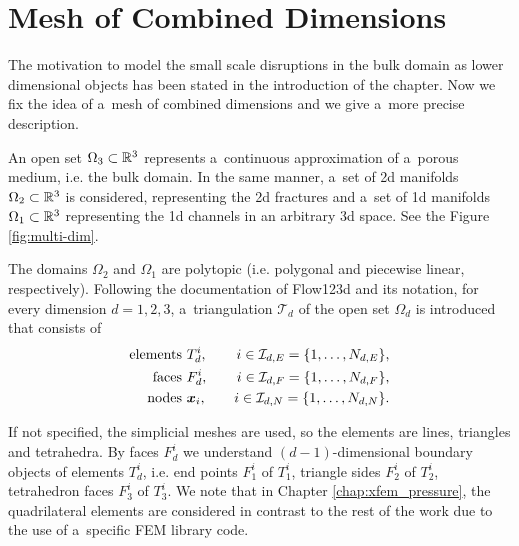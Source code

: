 \section{Mesh of Combined Dimensions} \label{sec:mesh_combined}
The motivation to model the small scale disruptions in the bulk domain as lower dimensional objects has been
stated in the introduction of the chapter. Now we fix the idea of a~mesh of combined dimensions and we give
a~more precise description.

An open set $\Omega_{3} \subset {\mathbb{R}}^3$ represents a~continuous approximation of a~porous medium, i.e. the bulk domain.
In the same manner, a~set of 2d manifolds $\Omega_2 \subset {\mathbb{R}}^3$ is considered, representing the 2d fractures
and a~set of 1d manifolds $\Omega_1 \subset {\mathbb{R}}^3$ representing the 1d channels in an arbitrary 3d space.
See the Figure \ref{fig:multi-dim}.


The domains $\Omega_2$ and $\Omega_1$ are polytopic (i.e. polygonal and piecewise linear, respectively).
Following the documentation of Flow123d \cite{flow123d_doc_2018} and its notation,
for every dimension $d=1,2,3$, a~triangulation $\mathcal{T}_{d}$ of the open set $\Omega_d$
is introduced that consists of
\begin{equation}
\begin{aligned}
    \textrm{elements } & T_{d}^{i}, & \quad i \in\mathcal{I}_{d,E} = \{1,\dots,N_{d,E} \}, \\
    \textrm{faces }    & F_{d}^{i}, & \quad i \in\mathcal{I}_{d,F} = \{1,\dots,N_{d,F} \}, \\
    \textrm{nodes }    & \mathbf{\boldsymbol{x}}_{i}, & \quad i \in\mathcal{I}_{d,N} = \{1,\dots,N_{d,N} \}.
\end{aligned}
\end{equation}

If not specified, the simplicial meshes are used, so the elements are lines, triangles and tetrahedra.
By faces $F^i_d$ we understand $(d-1)$-dimensional boundary objects of elements $T_d^i$,
i.e. end points $F^i_1$ of $T^i_1$, triangle sides $F^i_2$ of $T^i_2$, tetrahedron faces $F^i_3$ of $T^i_3$.
We note that in Chapter \ref{chap:xfem_pressure}, the quadrilateral elements are considered in contrast to the rest of the work
due to the use of a~specific FEM library code.


